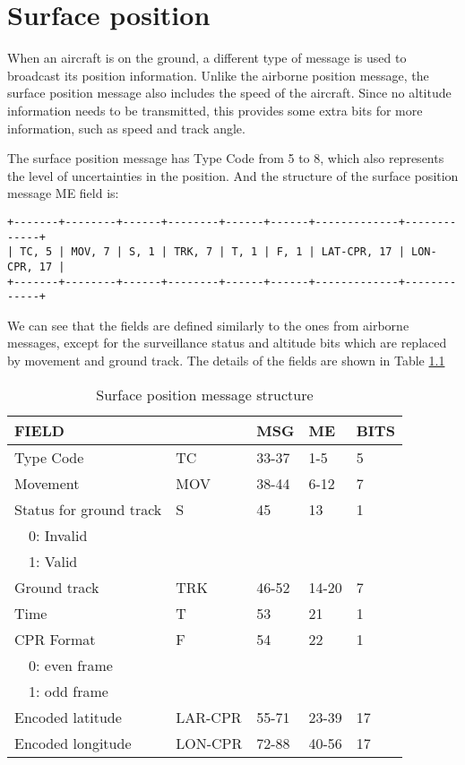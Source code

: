 \chapter{Surface position}

When an aircraft is on the ground, a different type of message is used to broadcast its position information. Unlike the airborne position message, the surface position message also includes the speed of the aircraft. Since no altitude information needs to be transmitted, this provides some extra bits for more information, such as speed and track angle.

The surface position message has Type Code from 5 to 8, which also represents the level of uncertainties in the position. And the structure of the surface position message ME field is:


\begin{verbatim}
+-------+--------+------+--------+------+------+-------------+-------------+
| TC, 5 | MOV, 7 | S, 1 | TRK, 7 | T, 1 | F, 1 | LAT-CPR, 17 | LON-CPR, 17 |
+-------+--------+------+--------+------+------+-------------+-------------+
\end{verbatim}

We can see that the fields are defined similarly to the ones from airborne messages, except for the surveillance status and altitude bits which are replaced by movement and ground track. The details of the fields are shown in Table \ref{tb:adsb-surf-pos-fields}

\begin{table}[ht]
\caption{Surface position message structure}
\label{tb:adsb-surf-pos-fields}
\begin{tabular}{|l|l|l|l|l|}
\hline
\textbf{FIELD} & \textbf{} & \textbf{MSG} & \textbf{ME} & \textbf{BITS} \\ \hline
Type Code & TC & 33-37 & 1-5 & 5 \\ \hline
Movement & MOV & 38-44 & 6-12 & 7 \\ \hline
Status for ground track & S & 45 & 13 & 1\\
~~0: Invalid & & & &\\
~~1: Valid & & & &\\ \hline
Ground track & TRK & 46-52 & 14-20 & 7 \\ \hline
Time & T & 53 & 21 & 1 \\ \hline
CPR Format  & F & 54 & 22 & 1\\
~~0: even frame & & & &\\
~~1: odd frame & & & &\\ \hline
Encoded latitude & LAR-CPR & 55-71 & 23-39 & 17 \\ \hline
Encoded longitude & LON-CPR & 72-88 & 40-56 & 17 \\ \hline
\end{tabular}
\end{table}


